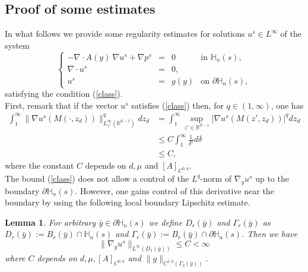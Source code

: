 \documentclass[11pt, reqno]{amsart}
\newtheorem{lemma}[theorem]{Lemma}
\theoremstyle{definition}
\theoremstyle{remark}
\numberwithin{equation}{section}
\begin{document}
	
	\begin{appendices}
	\section{Proof of some estimates}\label{append_estim}
\noindent In what follows we provide some regularity estimates for solutions $u^s\in L^\infty$ of   the  system
\begin{equation}\label{StokesinHs}
	\left\{
	\begin{array}{rcll}
		-\nabla\cdot A (y) \: \nabla u^s +  \nabla p^s&=& 0  &\mbox{in } {\mathbb{H}}_n(s),\\
		\nabla\cdot u^s &=& 0, &\\
		u^s &=& g (y)   &\mbox{on } \partial{\mathbb{H}}_n(s),
	\end{array}
	\right. 
\end{equation}
 satisfying the condition (\ref{class}).\\

\noindent First, remark that if the vector  $u^s$ satisfies (\ref{class}) then, for $q\in(1,\infty)$, one has 
\begin{align}
	\int_{1}^\infty  \| \nabla u^s(M (\cdot,z_d))\|^q_{L_{z'}^\infty(\mathbb{R}^{d-1})} dz_d &=   \int_{1}^\infty  \sup_{z'\in \mathbb{R}^{d-1}} | \nabla u^s(M(z',z_d))|^q dz_d\nonumber \\
	&\leq C   \int_{1}^\infty \frac{1}{\delta^q} d\delta\nonumber \\
	&\leq C ,  \label{estim_deriv_u_delta0} 
\end{align}where the constant $C$ depends on $d,\mu$ and $[A]_{C^{0,\eta}}$.\\


\noindent The bound (\ref{class})  does not allow a control of the $L^q$-norm of $ \nabla_{\! y} u^s$ up to the boundary  $ \partial{\mathbb{H}}_n(s)$. However, one gains control of this derivative near the boundary by using the following local boundary Lipschitz estimate.

\begin{lemma}\label{localboundaryLipsch}
	For arbitrary $\bar{y} \in \partial{\mathbb{H}}_n(s)$ we define  $D_r (\bar{y})$ and  $\Gamma_r (\bar{y})$ as  $D_r (\bar{y} ):= B_r (\bar{y} )\cap {\mathbb{H}}_n(s)$ and  $\Gamma_r (\bar{y}):= B_r (\bar{y})\cap \partial{\mathbb{H}}_n(s)$. Then we have 
	\begin{equation}\label{localboundaryLipsch_estim}
		\| \nabla_{\! y} u^s \|_{L^{\infty}(D_1(\bar{y}))} \leq  C<\infty
	\end{equation}
	where $C$ depends on $d,\mu, [A]_{C^{0,\eta}}$ and $\| g \|_{ C^{1,\eta}(\Gamma_2 ( \bar{y} ) ) }$.
\end{lemma}


\end{appendices}
\end{document}
